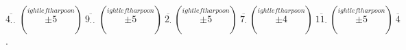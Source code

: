\documentclass[preview]{standalone}
\begin{document}
\begin{center}
$\overline{4_{\cdot\cdot}} \ (\stackrel{
ightleftharpoon}{\pm5}) \ \overline{9_{\cdot\cdot}} \ (\stackrel{
ightleftharpoon}{\pm5}) \ \overline{2_\cdot} \ (\stackrel{
ightleftharpoon}{\pm5}) \ \overline{7_\cdot} \ (\stackrel{
ightleftharpoon}{\pm4}) \ \overline{11_\cdot} \ (\stackrel{
ightleftharpoon}{\pm5}) \ \overline{4}$.
\end{center}
\end{document}
